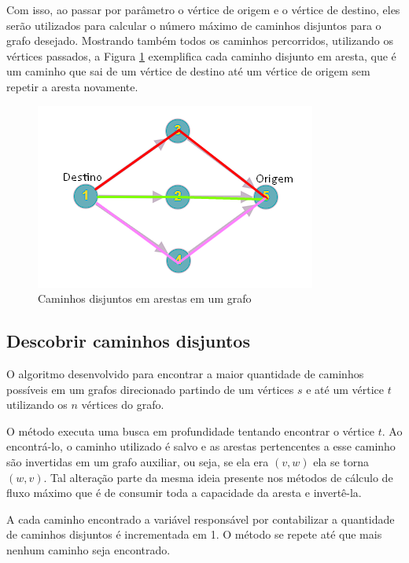 Com isso, ao passar por parâmetro o vértice de origem e o vértice de destino, eles serão utilizados para calcular o número máximo de caminhos disjuntos para o grafo desejado. Mostrando também todos os caminhos percorridos, utilizando os vértices passados, a Figura \ref{fig:figure2} exemplifica cada caminho disjunto em aresta, que é um caminho que sai de um vértice de destino até um vértice de origem sem repetir a aresta novamente.

\newpage

\begin{figure}[ht]
    \centering
    \includegraphics[width=.5\textwidth]{figuras/disjoint paths.png}
    \caption{Caminhos disjuntos em arestas em um grafo}
    \label{fig:figure2}
\end{figure}

\subsection{Descobrir caminhos disjuntos}

O algoritmo desenvolvido para encontrar a maior quantidade de caminhos possíveis em um grafos direcionado partindo de um vértices \(s\) e até um vértice \(t\) utilizando os \(n\) vértices do grafo.

O método executa uma busca em profundidade tentando encontrar o vértice \(t\). Ao encontrá-lo, o caminho utilizado é salvo e as arestas pertencentes a esse caminho são invertidas em um grafo auxiliar, ou seja, se ela era \((v,w)\) ela se torna \((w,v)\). Tal alteração parte da mesma ideia presente nos métodos de cálculo de fluxo máximo que é de consumir toda a capacidade da aresta e invertê-la. 

A cada caminho encontrado a variável responsável por contabilizar a quantidade de caminhos disjuntos é incrementada em 1. O método se repete até que mais nenhum caminho seja encontrado.

